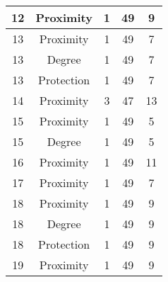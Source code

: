 \documentclass[results.tex]{subfiles}
\begin{document}
\begin{center}
\begin{tabular}{| c || c | c | c | c |}
            \hline
            12                      & Proximity                    & 1                      & 49                      & 9                    \\
            \hline
            13                      & Proximity                    & 1                      & 49                      & 7                    \\
            \hline
            13                      & Degree                       & 1                      & 49                      & 7                    \\
            \hline
            13                      & Protection                   & 1                      & 49                      & 7                    \\
            \hline
            14                      & Proximity                    & 3                      & 47                      & 13                   \\
            \hline
            15                      & Proximity                    & 1                      & 49                      & 5                    \\
            \hline
            15                      & Degree                       & 1                      & 49                      & 5                    \\
            \hline
            16                      & Proximity                    & 1                      & 49                      & 11                   \\
            \hline
            17                      & Proximity                    & 1                      & 49                      & 7                    \\
            \hline
            18                      & Proximity                    & 1                      & 49                      & 9                    \\
            \hline
            18                      & Degree                       & 1                      & 49                      & 9                    \\
            \hline
            18                      & Protection                   & 1                      & 49                      & 9                    \\
            \hline
            19                      & Proximity                    & 1                      & 49                      & 9                    \\

\end{tabular}
\end{center}
\end{document}
